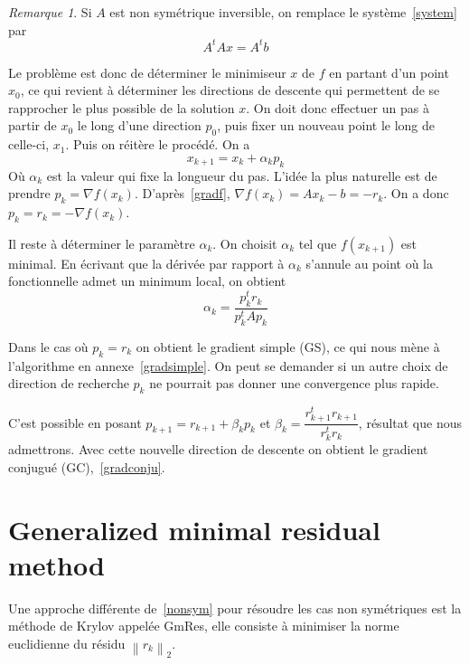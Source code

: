 \documentclass[twoside,12pt]{report}
\theoremstyle{remark}
\newtheorem*{rem*}{Remarque}
\begin{document}
\begin{rem*}
Si $A$ est non symétrique inversible, on remplace le système~\eqref{system} par
\begin{equation}
A^tAx=A^tb \label{nonsym}
\end{equation}
\end{rem*}

Le problème est donc de déterminer le minimiseur $x$ de $f$ en partant d'un point $x_0$, ce qui revient à déterminer les directions de descente qui permettent de se rapprocher le plus possible de la solution $x$. On doit donc effectuer un pas à partir de $x_0$ le long d'une direction $p_0$, puis fixer un nouveau point le long de celle-ci, $x_1$. Puis on réitère le procédé. On a
\begin{equation*}
x_{k+1}=x_k+\alpha_k p_k
\end{equation*}
Où $\alpha_k$ est la valeur qui fixe la longueur du pas. L'idée la plus naturelle est de prendre $p_k=\nabla f(x_k)$. D'après~\eqref{gradf}, $\nabla f(x_k)=Ax_k -b=-r_k$. On a donc $p_k=r_k=-\nabla f(x_k)$.

Il reste à déterminer le paramètre $\alpha_k$. On choisit $\alpha_k$ tel que $f(x_{k+1})$ est minimal. En écrivant que la dérivée par rapport à $\alpha_k$ s'annule au point où la fonctionnelle admet un minimum local, on obtient
\begin{equation*}
\alpha_k=\dfrac{p_k^t r_k}{p_k^t Ap_k}
\end{equation*}

Dans le cas où $p_k=r_k$ on obtient le gradient simple (GS), ce qui nous mène à l'algorithme en annexe~\ref{gradsimple}. On peut se demander si un autre choix de direction de recherche $p_k$ ne pourrait pas donner une convergence plus rapide.

C'est possible en posant $p_{k+1}=r_{k+1}+\beta_k p_k$ et $\beta_{k}=\dfrac{r_{k+1}^t r_{k+1}}{r_k^t r_k}$, résultat que nous admettrons. Avec cette nouvelle direction de descente on obtient le gradient conjugué (GC),~\ref{gradconju}.

\section{Generalized minimal residual method}

Une approche différente de~\ref{nonsym} pour résoudre les cas non symétriques est la méthode de Krylov appelée GmRes, elle consiste à minimiser la norme euclidienne du résidu $\left\|r_k\right\|_2$.
\end{document}
